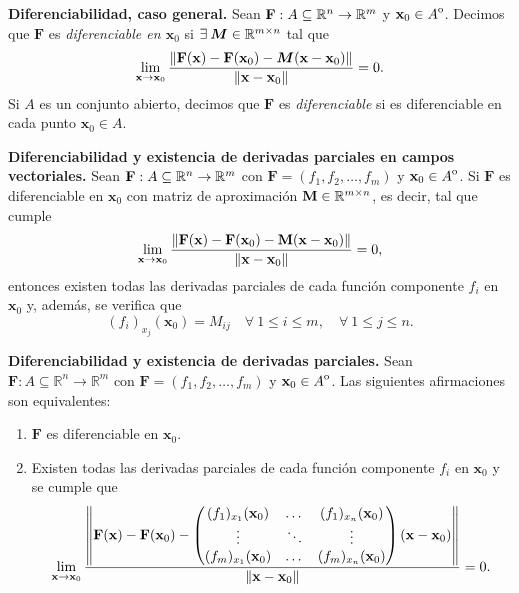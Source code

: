 \begin{definition}\textbf{Diferenciabilidad, caso general.} \label{def:dif_general}  Sean $ \mathbf{F}: A  \subseteq  \mathbb{R}^n \to \mathbb{R}^m$ y $\mathbf{x}_0 \in {\kern0ptA}^{\mathrm{o}}$. Decimos que $\mathbf{F}$ es \emph{diferenciable en $\mathbf{x}_0$} si $\exists\:\boldsymbol{M} \in \mathbb{R}^{m \times n}$ tal que
\[
  \lim_{\mathbf{x} \to \mathbf{x}_0} \frac{\norm{\mathbf{F}(\mathbf{x}) - \mathbf{F}(\mathbf{x}_0) - \boldsymbol{M}  (\mathbf{x} - \mathbf{x}_0)}}{\norm{\mathbf{x} - \mathbf{x}_0}} = 0.
\]
Si $A$ es un conjunto abierto, decimos que $\mathbf{F}$ es \emph{diferenciable} si es diferenciable en cada punto $\mathbf{x}_0 \in A$.
\end{definition}


\begin{theorem}\textbf{Diferenciabilidad y existencia de derivadas parciales en campos vectoriales.} 
Sean $\mathbf{F}: A \subseteq \mathbb{R}^n \to \mathbb{R}^m$ con $\mathbf{F}=(f_1, f_2, \dots, f_m)$ y $\mathbf{x}_0 \in {\kern0ptA}^{\mathrm{o}}$. Si $\mathbf{F}$ es diferenciable en $\mathbf{x}_0$ con matriz de aproximación $\mathbf{M} \in \mathbb{R}^{m \times n}$, es decir, tal que cumple
\[
 \lim_{\mathbf{x} \to \mathbf{x}_0} \frac{\norm{\mathbf{F}(\mathbf{x}) - \mathbf{F}(\mathbf{x}_0) - \mathbf{M}(\mathbf{x} - \mathbf{x}_0)}}{\norm{\mathbf{x} - \mathbf{x}_0}} = 0,
\]
entonces existen todas las derivadas parciales de cada función componente $f_i$ en $\mathbf{x}_0$ y, además, se verifica que
\[
 ({f_i})_{x_j} (\mathbf{x}_0) = M_{ij} \quad \forall   \: 1 \leq i \leq  m, \quad \forall \:   1 \leq j \leq n.
\]
\end{theorem}





\begin{corollary} \textbf{Diferenciabilidad y existencia de derivadas parciales.} \label{teo:difDergeneral}
Sean $\mathbf{F}: A \subseteq \mathbb{R}^{n} \to \mathbb{R}^{m}$ con $\mathbf{F}=(f_1, f_2, \dots, f_m)$ y $\mathbf{x}_0 \in {\kern0ptA}^{\mathrm{o}}$. Las siguientes afirmaciones son equivalentes:
\begin{enumerate}
  \item $\mathbf{F}$ es diferenciable en $\mathbf{x}_0$.
  \item Existen todas las derivadas parciales de cada función componente $f_i$ en $\mathbf{x}_0$ y se cumple que
  \[
   \lim_{\mathbf{x} \to \mathbf{x}_0} \frac{\norm{\mathbf{F}(\mathbf{x}) - \mathbf{F}(\mathbf{x}_0) - 
   \begin{pmatrix}
     (f_1)_{x_1}(\mathbf{x}_0) & \dots & (f_1)_{x_n}(\mathbf{x}_0) \\
     \vdots & \ddots & \vdots \\
     (f_m)_{x_1}(\mathbf{x}_0) & \dots & (f_m)_{x_n}(\mathbf{x}_0)
   \end{pmatrix} 
   (\mathbf{x} - \mathbf{x}_0)}}{\norm{\mathbf{x} - \mathbf{x}_0}} = 0.
  \]
\end{enumerate}
\end{corollary}






